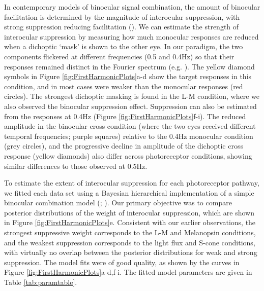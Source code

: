 \documentclass[
]{article}
\begin{document}
In contemporary models of binocular signal combination, the amount of binocular facilitation is determined by the magnitude of interocular suppression, with strong suppression reducing facilitation (). We can estimate the strength of interocular suppression by measuring how much monocular responses are reduced when a dichoptic `mask' is shown to the other eye. In our paradigm, the two components flickered at different frequencies (0.5 and 0.4Hz) so that their responses remained distinct in the Fourier spectrum (e.g. ). The yellow diamond symbols in Figure \ref{fig:FirstHarmonicPlots}a-d show the target responses in this condition, and in most cases were weaker than the monocular responses (red circles). The strongest dichoptic masking is found in the L-M condition, where we also observed the binocular suppression effect. Suppression can also be estimated from the responses at 0.4Hz (Figure \ref{fig:FirstHarmonicPlots}f-i). The reduced amplitude in the binocular cross condition (where the two eyes received different temporal frequencies; purple squares) relative to the 0.4Hz monocular condition (grey circles), and the progressive decline in amplitude of the dichoptic cross response (yellow diamonds) also differ across photoreceptor conditions, showing similar differences to those observed at 0.5Hz.

To estimate the extent of interocular suppression for each photoreceptor pathway, we fitted each data set using a Bayesian hierarchical implementation of a simple binocular combination model (; ). Our primary objective was to compare posterior distributions of the weight of interocular suppression, which are shown in Figure \ref{fig:FirstHarmonicPlots}e. Consistent with our earlier observations, the strongest suppressive weight corresponds to the L-M and Melanopsin conditions, and the weakest suppression corresponds to the light flux and S-cone conditions, with virtually no overlap between the posterior distributions for weak and strong suppression. The model fits were of good quality, as shown by the curves in Figure \ref{fig:FirstHarmonicPlots}a-d,f-i. The fitted model parameters are given in Table \ref{tab:paramtable}.
\end{document}

